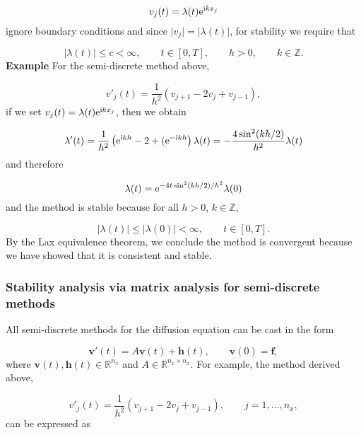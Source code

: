 \documentclass[12pt,a4paper]{article}
\begin{document}
\[
v_j(t) = \lambda(t){\rm e}^{{\rm i}kx_j}
\]
ignore boundary conditions and since $\vert v_j \vert = \vert\lambda(t) \vert$, for stability we require that

\[
\left\vert \lambda(t)\right \vert \leq c < \infty, \qquad t \in [0, T], \qquad h>0, \qquad k \in \mathbb{Z}.
\]
\textbf{Example} For the semi-discrete method above,

\[
v'_j(t) = \frac{1}{h^2}\left(v_{j+1} - 2v_j + v_{j-1}   \right),
\]
if we set $v_j(t) = \lambda(t){\rm e}^{{\rm i}kx_j}$, then we obtain

\[
\lambda'(t) = \frac{1}{h^2}\left({\rm e}^{{\rm i}kh} - 2 +   ({\rm e}^{-{\rm i}kh} \right)\lambda(t) = -\frac{4\sin^2(kh/2)}{h^2}\lambda(t)
\]
and therefore

\[
\lambda(t) = {\rm e}^{-4t\sin^2(kh/2)/h^2}\lambda(0) 
\]
and the method is stable because for all $h > 0$, $k \in \mathbb{Z}$,

\[
\vert \lambda(t) \vert \leq  \vert \lambda(0) \vert < \infty, \qquad   t \in [0, T].
\]
By the Lax equivalence theorem, we conclude the method is convergent because we have showed that it is consistent and stable.

\subsubsection{Stability analysis via matrix analysis for semi-discrete methods}
All semi-discrete methods for the diffusion equation can be cast in the form

\[
\mathbf{v}'(t) = A\mathbf{v}(t) + \mathbf{h}(t), \qquad \mathbf{v}(0) = \mathbf{f}, 
\]
where $\mathbf{v}(t), \mathbf{h}(t) \in \mathbb{R}^{n_x}$ and  $A \in \mathbb{R}^{n_x \times n_x}$.  For example, the method derived above,

\[
v'_j(t) = \frac{1}{h^2}\left(v_{j+1} - 2v_j + v_{j-1}   \right), \qquad j  = 1, \ldots, n_x,
\]
can be expressed as
\end{document}
